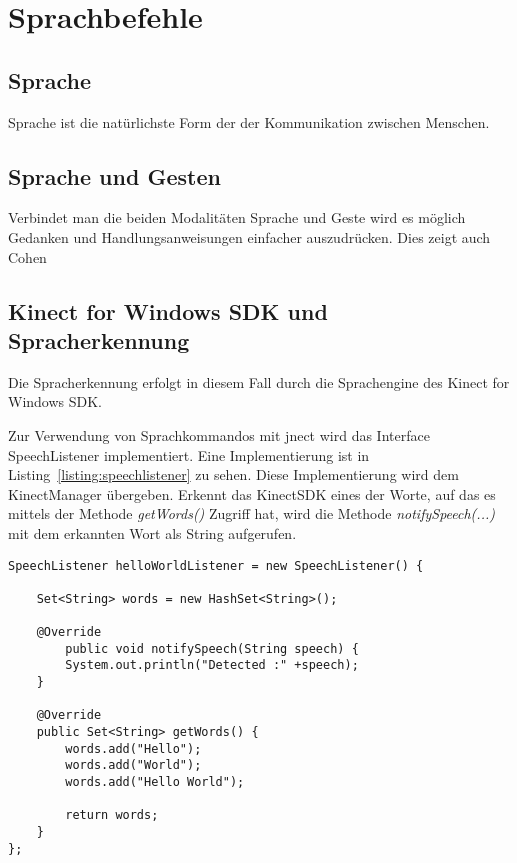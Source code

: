 \chapter{Sprachbefehle}
\label{chap:Sprachbefehle}


\section{Sprache}

Sprache ist die nat\"urlichste Form der der Kommunikation zwischen Menschen. 

\section{Sprache und Gesten}

Verbindet man die beiden Modalit\"aten Sprache und Geste wird es m\"oglich Gedanken und Handlungsanweisungen einfacher auszudr\"ucken. Dies zeigt auch Cohen~\cite{bib:}

\section{Kinect for Windows SDK und Spracherkennung}

Die Spracherkennung erfolgt in diesem Fall durch die Sprachengine des Kinect for Windows SDK.

Zur Verwendung von Sprachkommandos mit jnect wird das Interface SpeechListener implementiert. Eine Implementierung ist in Listing~\ref{listing:speechlistener} zu sehen. Diese Implementierung wird dem KinectManager 
\"ubergeben. Erkennt das KinectSDK eines der Worte, auf das es mittels der Methode \textit{getWords()} Zugriff hat, wird die Methode \textit{notifySpeech(...)} mit dem 
erkannten Wort als String aufgerufen.

\lstset{language=Java,
 basicstyle=\footnotesize, 
 numbers=left,
 captionpos=b,
 showspaces=false,             
 showstringspaces=false,}
\begin{lstlisting}[caption={jnect SpeechListener Implementation}, label={listing:speechlistener}]
SpeechListener helloWorldListener = new SpeechListener() {
			
	Set<String> words = new HashSet<String>();
			
	@Override
		public void notifySpeech(String speech) {
		System.out.println("Detected :" +speech);
	}
			
	@Override
	public Set<String> getWords() {
		words.add("Hello");
		words.add("World");
		words.add("Hello World");
				
		return words;
	}
};
\end{lstlisting}


